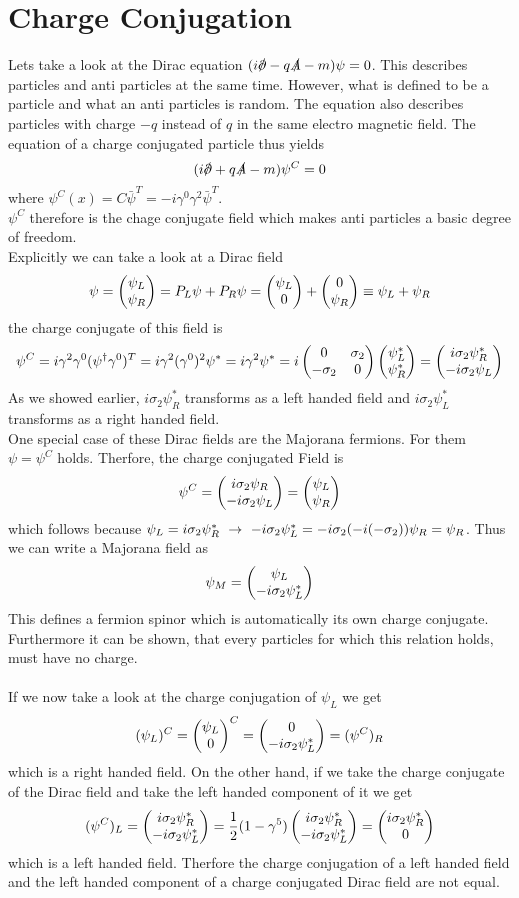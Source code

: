 \section{Charge Conjugation}
Lets take a look at the Dirac equation $(i \slashed{\p} - q \slashed{A} -m ) \psi = 0$. This describes particles and anti particles at the same time. However, what is defined to be a particle and what an anti particles is random. The equation also describes particles with charge $-q$ instead of $q$ in the same electro magnetic field. The equation of a charge conjugated particle thus yields
\[ ( i \slashed{\p} + q \slashed{A} - m) \psi^C = 0\]
where $\psi^C(x) = C \bar{\psi}^T = - i \gamma^0 \gamma^2 \bar{\psi}^T$.\\
$\psi^C$ therefore is the chage conjugate field which makes anti particles a basic degree of freedom.\\
Explicitly we can take a look at a Dirac field
\[ \psi = \begin{pmatrix} \psi_L \\ \psi_R \end{pmatrix} = P_L \psi + P_R\psi = \begin{pmatrix} \psi_L \\ 0 \end{pmatrix} + \begin{pmatrix} 0 \\ \psi_R \end{pmatrix} \equiv \psi_L + \psi_R\]
the charge conjugate of this field is
\[ \psi^C = i \gamma^2 \gamma^0 ( \psi^\dagger \gamma^0 )^T = i \gamma^2 (\gamma^0)^2 \psi^* = i \gamma^2 \psi^* = i \begin{pmatrix}0&\sigma_2\\-\sigma_2&0\end{pmatrix} \begin{pmatrix} \psi_L^* \\ \psi_R^* \end{pmatrix} = \begin{pmatrix} i \sigma_2 \psi_R^* \\ -i\sigma_2\psi_L \end{pmatrix}\]
As we showed earlier, $i \sigma_2 \psi_R^*$ transforms as a left handed field and $i \sigma_2 \psi_L^*$ transforms as a right handed field.\\
One special case of these Dirac fields are the Majorana fermions. For them $\psi = \psi^C$ holds. Therfore, the charge conjugated Field is
\[ \psi^C = \begin{pmatrix} i \sigma_2 \psi_R \\ -i \sigma_2 \psi_L \end{pmatrix} = \begin{pmatrix} \psi_L \\ \psi_R \end{pmatrix}\]
which follows because $\psi_L = i \sigma_2 \psi_R^* ~\rightarrow~ -i \sigma_2 \psi_L^* = -i \sigma_2( -i(-\sigma_2)) \psi_R = \psi_R$. Thus we can write a Majorana field as
\[ \psi_M = \begin{pmatrix} \psi_L \\ -i \sigma_2 \psi_L^* \end{pmatrix}\]
This defines a fermion spinor which is automatically its own charge conjugate. Furthermore it can be shown, that every particles for which this relation holds, must have no charge.\\
\\
If we now take a look at the charge conjugation of $\psi_L$ we get
\[ (\psi_L)^C = \begin{pmatrix} \psi_L \\ 0 \end{pmatrix}^C = \begin{pmatrix}  0 \\ -i \sigma_2 \psi_L^* \end{pmatrix} = (\psi^C)_R\]
which is a right handed field. On the other hand, if we take the charge conjugate of the Dirac field and take the left handed component of it we get
\[ (\psi^C)_L = \begin{pmatrix}  i \sigma_2 \psi_R^* \\ -i \sigma_2 \psi_L^* \end{pmatrix} = \frac{1}{2} ( 1 - \gamma^5) \begin{pmatrix}  i \sigma_2 \psi_R^*  \\ -i \sigma_2 \psi_L^* \end{pmatrix} = \begin{pmatrix}  i \sigma_2 \psi_R^* \\ 0 \end{pmatrix} \]
which is a left handed field. Therfore the charge conjugation of a left handed field and the left handed component of a charge conjugated Dirac field are not equal.


 
